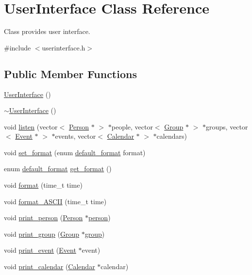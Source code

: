 \hypertarget{classUserInterface}{
\section{UserInterface Class Reference}
\label{df/de1/classUserInterface}
}


Class provides user interface.  




{\ttfamily \#include $<$userinterface.h$>$}

\subsection*{Public Member Functions}
\begin{DoxyCompactItemize}
\item 
\hyperlink{classUserInterface_ae6fb70370701b3bd6120e923df9705b0}{UserInterface} ()
\item 
\hyperlink{classUserInterface_ae588b2ff1711a016dd4c6fc5002c0841}{$\sim$UserInterface} ()
\item 
void \hyperlink{classUserInterface_a8aea06378a5d0b2d7bf338e947e2b87f}{listen} (vector$<$ \hyperlink{classPerson}{Person} $\ast$ $>$ $\ast$people, vector$<$ \hyperlink{classGroup}{Group} $\ast$ $>$ $\ast$groups, vector$<$ \hyperlink{classEvent}{Event} $\ast$ $>$ $\ast$events, vector$<$ \hyperlink{classCalendar}{Calendar} $\ast$ $>$ $\ast$calendars)
\item 
void \hyperlink{classUserInterface_a36513fcf018fafc53726cf610f46571f}{set\_\-format} (enum \hyperlink{userinterface_8h_a5a0e707f53d6c5632b2fb5ffd2d22a11}{default\_\-format} format)
\item 
enum \hyperlink{userinterface_8h_a5a0e707f53d6c5632b2fb5ffd2d22a11}{default\_\-format} \hyperlink{classUserInterface_ad543750a7accc0c4825e02a93fda1909}{get\_\-format} ()
\item 
void \hyperlink{classUserInterface_a9373bc1aedbdc68905942bcb7c6a8fd3}{format} (time\_\-t time)
\item 
void \hyperlink{classUserInterface_a41c109a7e042b44dc98a1250681fc684}{format\_\-ASCII} (time\_\-t time)
\item 
void \hyperlink{classUserInterface_a45a7ad6cca95218631d8c6fbe49362e2}{print\_\-person} (\hyperlink{classPerson}{Person} $\ast$\hyperlink{group__content_8h_ab8664e6fd42f01eeaad084b5e20eb54e}{person})
\item 
void \hyperlink{classUserInterface_a31424519b61f71584a4a5196c6632beb}{print\_\-group} (\hyperlink{classGroup}{Group} $\ast$\hyperlink{group__content_8h_a27517aa1480ab2d9bfe5d62e693b33eb}{group})
\item 
void \hyperlink{classUserInterface_aca628f5a276b39ff4346e2150b419590}{print\_\-event} (\hyperlink{classEvent}{Event} $\ast$event)
\item 
void \hyperlink{classUserInterface_aca95eaf06d053b4ac267e94ccb84e501}{print\_\-calendar} (\hyperlink{classCalendar}{Calendar} $\ast$calendar)
\end{DoxyCompactItemize}


